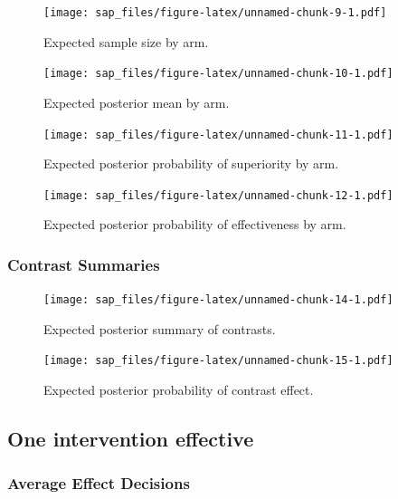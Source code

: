 \documentclass[
  bibliography=totoc]{scrreprt}
\begin{document}
\begin{figure}
\centering
\texttt{[image: sap\_files/figure-latex/unnamed-chunk-9-1.pdf]}
\caption{\label{fig:unnamed-chunk-9}Expected sample size by arm.}
\end{figure}

\begin{figure}
\centering
\texttt{[image: sap\_files/figure-latex/unnamed-chunk-10-1.pdf]}
\caption{\label{fig:unnamed-chunk-10}Expected posterior mean by arm.}
\end{figure}

\begin{figure}
\centering
\texttt{[image: sap\_files/figure-latex/unnamed-chunk-11-1.pdf]}
\caption{\label{fig:unnamed-chunk-11}Expected posterior probability of superiority by arm.}
\end{figure}

\begin{figure}
\centering
\texttt{[image: sap\_files/figure-latex/unnamed-chunk-12-1.pdf]}
\caption{\label{fig:unnamed-chunk-12}Expected posterior probability of effectiveness by arm.}
\end{figure}

\clearpage

\hypertarget{contrast-summaries}{%
\subsubsection{Contrast Summaries}\label{contrast-summaries}}

\begin{figure}
\centering
\texttt{[image: sap\_files/figure-latex/unnamed-chunk-14-1.pdf]}
\caption{\label{fig:unnamed-chunk-14}Expected posterior summary of contrasts.}
\end{figure}

\begin{figure}
\centering
\texttt{[image: sap\_files/figure-latex/unnamed-chunk-15-1.pdf]}
\caption{\label{fig:unnamed-chunk-15}Expected posterior probability of contrast effect.}
\end{figure}

\clearpage

\hypertarget{one-intervention-effective}{%
\subsection{One intervention effective}\label{one-intervention-effective}}

\hypertarget{average-effect-decisions-1}{%
\subsubsection{Average Effect Decisions}\label{average-effect-decisions-1}}
\end{document}
